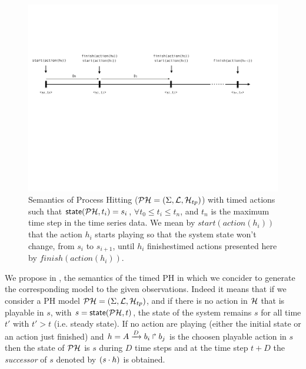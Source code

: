 \begin{figure}
\includegraphics[width=1\linewidth]{images/semantic-timed-PH}
\caption{Semantics of Process Hitting ($\mathcal{PH} = (\Sigma,\mathcal{L},\mathcal{H}_{tp})$) with timed actions such that $\textsf{state}(\mathcal{PH}, t_i)=s_i$, $ \forall t_0 \leq t_i \leq t_n$, and $t_n$ is the maximum time step in the time series data. We mean by $start(action(h_i))$ that the action $h_i$ starts playing so that the system state won't change, from $s_i$ to $s_{i+1}$, until $h_i$ finishestimed actions presented here by $finish(action(h_i))$.}
\end{figure}

We propose in , the semantics of the timed PH in which we concider to generate the corresponding model to the given observations. Indeed it means that if we consider a PH model $\mathcal{PH} = (\Sigma,\mathcal{L},\mathcal{H}_{tp})$, and if there is no action in $\mathcal{H}$ that is playable in $s$, with $s=\textsf{state}(\mathcal{PH}, t)$, the state of the system remains $s$ for all time $t'$ with $t' > t$ (i.e. steady state). If no action are playing (either the initial state or an action just finished) and $h = A\xrightarrow{D} b_i \Rsh b_j$ is the choosen playable action in $s$ then the state of $\mathcal{PH}$ is $s$ during $D$ time steps and at the time step $t+D$
the \emph{successor} of $s$ denoted by $(s \cdot h)$ is obtained.
\\

